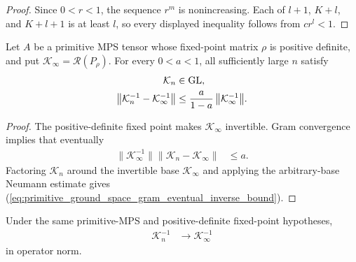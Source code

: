 \begin{proof}
    \leanok
    Since $0<r<1$, the sequence $r^m$ is nonincreasing.  Each of
    $l+1$, $K+l$, and $K+l+1$ is at least $l$, so every displayed inequality
    follows from $cr^l<1$.
\end{proof}

\begin{lemma}
    \label{thm:primitive_ground_space_gram_eventual_inverse_bound}
    \leanok
    Let $A$ be a primitive MPS tensor whose fixed-point matrix $\rho$ is
    positive definite, and put
    $\mathcal K_\infty=\mathscr R(P_\rho)$.  For every $0<a<1$, all
    sufficiently large $n$ satisfy
    \begin{align}
        \mathcal K_n & \in\operatorname{GL},
        \notag                               \\
        \bigl\lVert\mathcal K_n^{-1}-\mathcal K_\infty^{-1}\bigr\rVert
                     & \leq
        \frac{a}{1-a}\,\bigl\lVert\mathcal K_\infty^{-1}\bigr\rVert.
        \label{eq:primitive_ground_space_gram_eventual_inverse_bound}
    \end{align}
\end{lemma}

\begin{proof}
    \leanok
    The positive-definite fixed point makes
    $\mathcal K_\infty$ invertible.  Gram convergence implies that eventually
    \begin{align}
        \bigl\lVert\mathcal K_\infty^{-1}\bigr\rVert
        \bigl\lVert\mathcal K_n-\mathcal K_\infty\bigr\rVert & \leq a.
    \end{align}
    Factoring $\mathcal K_n$ around the invertible base
    $\mathcal K_\infty$ and applying the arbitrary-base Neumann estimate gives
    (\ref{eq:primitive_ground_space_gram_eventual_inverse_bound}).
\end{proof}

\begin{lemma}
    \label{thm:primitive_ground_space_gram_inverse_tendsto}
    \leanok
    Under the same primitive-MPS and positive-definite fixed-point hypotheses,
    \begin{align}
        \mathcal K_n^{-1} & \longrightarrow\mathcal K_\infty^{-1}
        \label{eq:primitive_ground_space_gram_inverse_tendsto}
    \end{align}
    in operator norm.
\end{lemma}

